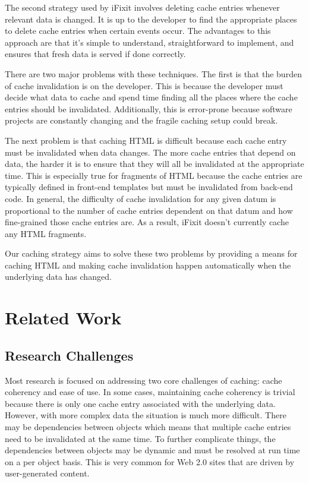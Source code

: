 \documentclass[12pt]{ucthesis}
\begin{document}
The second strategy used by \textsf{iFixit} involves deleting cache entries whenever relevant data is changed.
It is up to the developer to find the appropriate places to delete cache entries when certain events occur.
The advantages to this approach are that it's simple to understand, straightforward to implement, and ensures that fresh data is served if done correctly.

There are two major problems with these techniques.
The first is that the burden of cache invalidation is on the developer.
This is because the developer must decide what data to cache and spend time finding all the places where the cache entries should be invalidated.
Additionally, this is error-prone because software projects are constantly changing and the fragile caching setup could break.

The next problem is that caching HTML is difficult because each cache entry must be invalidated when data changes.
The more cache entries that depend on data, the harder it is to ensure that they will all be invalidated at the appropriate time.
This is especially true for fragments of HTML because the cache entries are typically defined in front-end templates but must be invalidated from back-end code.
In general, the difficulty of cache invalidation for any given datum is proportional to the number of cache entries dependent on that datum and how fine-grained those cache entries are.
As a result, \textsf{iFixit} doesn't currently cache any HTML fragments.

Our caching strategy aims to solve these two problems by providing a means for caching HTML and making cache invalidation happen automatically when the underlying data has changed.

\section{Related Work}
\subsection{Research Challenges}
Most research is focused on addressing two core challenges of caching: cache coherency and ease of use.
In some cases, maintaining cache coherency is trivial because there is only one cache entry associated with the underlying data.
However, with more complex data the situation is much more difficult.
There may be dependencies between objects which means that multiple cache entries need to be invalidated at the same time.
To further complicate things, the dependencies between objects may be dynamic and must be resolved at run time on a per object basis.
This is very common for Web 2.0 sites that are driven by user-generated content.
\end{document}
